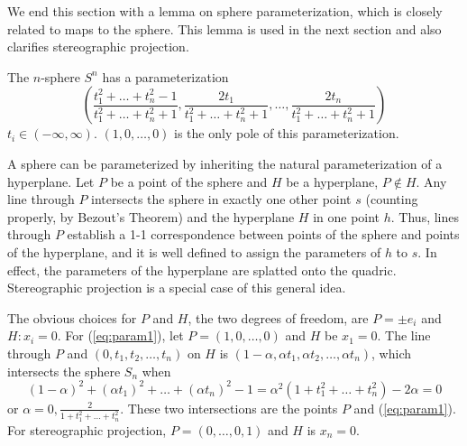 We end this section with a lemma on sphere parameterization,
which is closely related to maps to the sphere.
This lemma is used in the next section and also clarifies stereographic projection.

\begin{lemma}
\label{lem:sphereparam}
The $n$-sphere $S^n$ has a parameterization
\begin{equation}
\label{eq:param1}
	(\frac{t_1^2+\ldots+t_n^2-1}{t_1^2+\ldots+t_n^2+1},
	 \frac{2t_1}{t_1^2+\ldots+t_n^2+1},
	 \ldots, 
	 \frac{2t_n}{t_1^2+\ldots+t_n^2+1})
\end{equation}
$t_i\in(-\infty,\infty)$.
$(1,0,\ldots,0)$ is the only pole of this parameterization.
\end{lemma}
\prf
A sphere can be parameterized by inheriting the natural 
parameterization of a hyperplane.
Let $P$ be a point of the sphere and $H$ be a hyperplane, $P \not \in H$.
Any line through $P$ intersects the sphere in exactly one other point $s$ 
(counting properly, by Bezout's Theorem)
and the hyperplane $H$ in one point $h$.
Thus, lines through $P$ establish a 1-1 correspondence between points
of the sphere and points of the hyperplane, and it is well defined to
assign the parameters of $h$ to $s$.
In effect, the parameters of the hyperplane are splatted onto the quadric.
Stereographic projection is a special case of this general idea.

The obvious choices for $P$ and $H$, the two degrees of freedom, 
are $P=\pm e_i$ and $H: x_i=0$.
For (\ref{eq:param1}), let $P=(1,0,\ldots,0)$ and $H$ be $x_1=0$.
The line through $P$ and $(0,t_1,t_2,\ldots,t_n)$ on $H$
is \mbox{$(1-\alpha, \alpha t_1, \alpha t_2, \ldots, \alpha t_n)$}, 
which intersects the sphere $S_n$ when
\[
	(1-\alpha)^2 + (\alpha t_1)^2 + \ldots + (\alpha t_n)^2 - 1
	= \alpha^2 (1 + t_1^2 + \ldots + t_n^2) - 2 \alpha = 0
\] 
or $\alpha=0,\frac{2}{1 + t_1^2 + \ldots + t_n^2}$.
These two intersections are the points $P$ and (\ref{eq:param1}).
For stereographic projection, $P = (0,\ldots,0,1)$ and $H$ is $x_n=0$.
\QED

